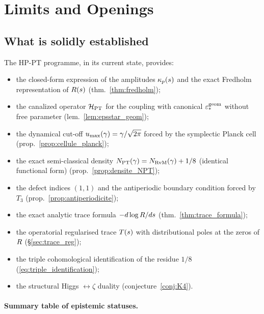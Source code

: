 \section{Limits and Openings}
\label{sec:limites_ouvertures}

\subsection{What is solidly established}
\label{sec:acquis}

The HP-PT programme, in its current state, provides:
\begin{itemize}[nosep,leftmargin=*]
\item the closed-form expression of the amplitudes $\kappa_p(s)$ and
the exact Fredholm representation of $R(s)$
(thm.~\ref{thm:fredholm});
\item the canalized operator $\mathcal{H}_{\mathrm{PT}}$ for the coupling
with canonical $\varepsilon_{*}^{\mathrm{geom}}$ without free parameter
(lem.~\ref{lem:epsstar_geom});
\item the dynamical cut-off $u_{\max}(\gamma) = \gamma/\sqrt{2\pi}$
forced by the symplectic Planck cell
(prop.~\ref{prop:cellule_planck});
\item the exact semi-classical density
$N_{\mathrm{PT}}(\gamma) = N_{\mathrm{RvM}}(\gamma) + 1/8$ (identical functional
form) (prop.~\ref{prop:densite_NPT});
\item the defect indices $(1, 1)$ and the antiperiodic boundary
condition forced by $T_3$ (prop.~\ref{prop:antiperiodicite});
\item the exact analytic trace formula $-d \log R/ds$
(thm.~\ref{thm:trace_formula});
\item the operatorial regularised trace $T(s)$ with
distributional poles at the zeros of $R$
(\S\ref{sec:trace_reg});
\item the triple cohomological identification of the residue $1/8$
(\eqref{eq:triple_identification});
\item the structural Higgs $\leftrightarrow \zeta$ duality
(conjecture~\ref{conj:K4}).
\end{itemize}

\paragraph{Summary table of epistemic statuses.}

